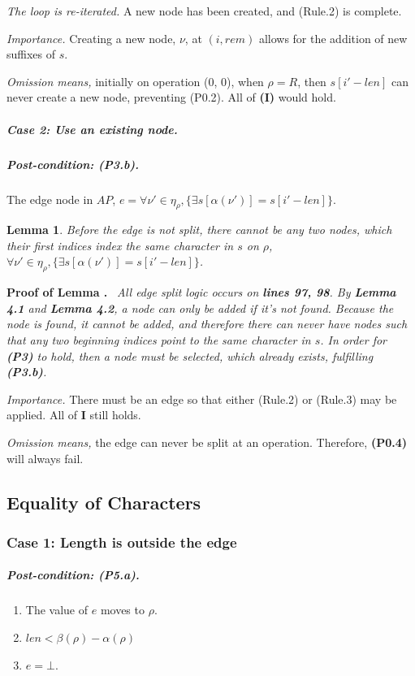\documentclass{article}
\newtheorem{lemma}{Lemma}[section]
\newenvironment{proof}{\par\noindent\textbf{Proof of Lemma \thelemma.}\ \itshape}{\par}
\begin{document}
	\textit{The loop is re-iterated.} A new node has been created, and (Rule.2) is complete.
		
	\textit{Importance.}  Creating a new node, $\nu$, at $(i, rem)$ allows for the addition of new suffixes of $s$.
	
	\textit{Omission means,} initially on operation (0, 0), when $\rho = R$, then $s[i\prime - len]$ can never create a new node, preventing (P0.2).  All of \textbf{(I)} would hold.
	
	\subparagraph{Case 2: Use an existing node.}
	\subparagraph{Post-condition: (P3.b).} The edge node in $AP$, $e = \forall \nu\prime \in \eta_{\rho}, \{\exists s[\alpha(\nu\prime)] = s[i\prime - len]\}$.

	\begin{lemma}
		Before the edge is not split, there cannot be any two nodes, which their first indices index the same character in $s$ on $\rho$, $\forall \nu\prime \in \eta_{\rho}, \{\exists s[\alpha(\nu\prime)] = s[i\prime - len]\}$.
	\end{lemma}
	
	\begin{proof}
		All edge split logic occurs on \textbf{lines 97, 98}.   
		By \textbf{Lemma 4.1} and \textbf{Lemma 4.2}, a node can only be added if it's not found.  Because the node is found, it cannot be added, and therefore there can never have nodes such that any two beginning indices point to the same character in $s$.  In order for \textbf{(P3)} to hold, then a node must be selected, which already exists, fulfilling \textbf{(P3.b)}.
	\end{proof}
	
	\textit{Importance.} There must be an edge so that either (Rule.2) or (Rule.3) may be applied.  All of \textbf{I} still holds.
	
	\textit{Omission means,} the edge can never be split at an operation.  Therefore, \textbf{(P0.4)} will always fail.

	
	\subsection{Equality of Characters}	
	\subsubsection{Case 1: Length is outside the edge}
	\subparagraph{Post-condition: (P5.a).} 
	\begin{enumerate}[label=(P5.a.\arabic*), ref=(P3.a.\arabic*)]
		\item The value of $e$ moves to $\rho$.
		\item $len < \beta(\rho) - \alpha(\rho)$
		\item $e = \bot$.
	\end{enumerate}
	
\end{document}
